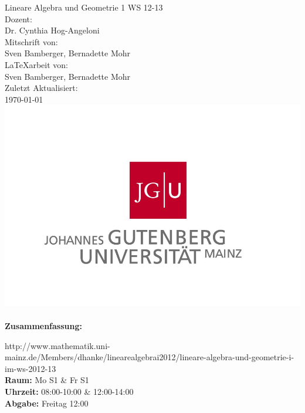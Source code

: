 \begin{titlepage}
\center
\Large Lineare Algebra und Geometrie 1 WS 12-13\large \\[2em]
Dozent:\\Dr. Cynthia Hog-Angeloni\\[2em]
Mitschrift von:\\Sven Bamberger, Bernadette Mohr\\[2em]
\LaTeX{arbeit} von:\\Sven Bamberger, Bernadette Mohr\\[2em]
Zuletzt Aktualisiert:\\\today\\
\includegraphics[scale=.2]{front/pics/Logo.jpg}\\\quad\\
\Large \textbf{Zusammenfassung:}\\[1em]
\parbox{0.75\textwidth}{\large
http://www.mathematik.uni-mainz.de/Members/dhanke/linearealgebrai2012/lineare-algebra-und-geometrie-i-im-ws-2012-13\
\\
\textbf{Raum:} Mo S1 \& Fr S1\\
\textbf{Uhrzeit:} 08:00-10:00 \& 12:00-14:00\\
\textbf{Abgabe:} Freitag 12:00\\
}
\end{titlepage}
